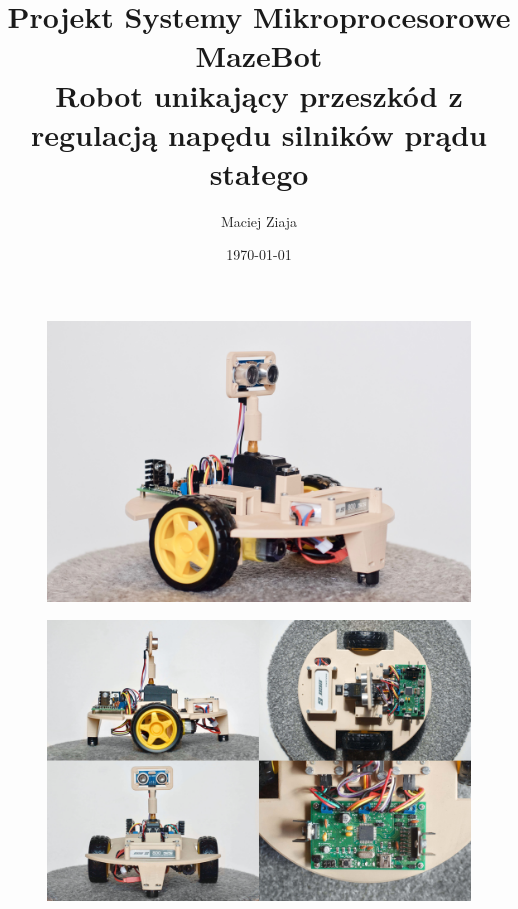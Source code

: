 \documentclass[11pt]{article}
\author{Maciej Ziaja}
\date{\today}
\begin{document}
\title{
	Projekt Systemy Mikroprocesorowe \\
	\large MazeBot \\
	Robot unikający przeszkód z regulacją napędu silników prądu stałego}

\maketitle

\vfill
\begin{figure}[!htbp]
	\centering
	\includegraphics[width=\linewidth]{"Title Page Photo"}
\end{figure}
\vfill

\begin{figure}
	\centering
	\includegraphics[width=\linewidth]{"Overview Collage"}
\end{figure}
\end{document}
